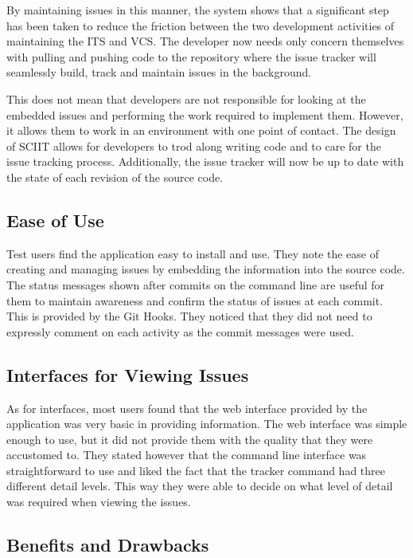 \documentclass{mproj}
\begin{document}
By maintaining issues in this manner, the system shows that a significant step has been taken to reduce the friction between the two development activities of maintaining the ITS and VCS. The developer now needs only concern themselves with pulling and pushing code to the repository where the issue tracker will seamlessly build, track and maintain issues in the background.

This does not mean that developers are not responsible for looking at the embedded issues and performing the work required to implement them. However, it allows them to work in an environment with one point of contact. The design of SCIIT allows for developers to trod along writing code and to care for the issue tracking process. Additionally, the issue tracker will now be up to date with the state of each revision of the source code.

\subsection{Ease of Use}

Test users find the application easy to install and use. They note the ease of creating and managing issues by embedding the information into the source code. The status messages shown after commits on the command line are useful for them to maintain awareness and confirm the status of issues at each commit. This is provided by the Git Hooks. They noticed that they did not need to expressly comment on each activity as the commit messages were used.

\subsection{Interfaces for Viewing Issues}

As for interfaces, most users found that the web interface provided by the application was very basic in providing information. The web interface was simple enough to use, but it did not provide them with the quality that they were accustomed to. They stated however that the command line interface was straightforward to use and liked the fact that the tracker command had three different detail levels. This way they were able to decide on what level of detail was required when viewing the issues.

\subsection{Benefits and Drawbacks}
\end{document}
